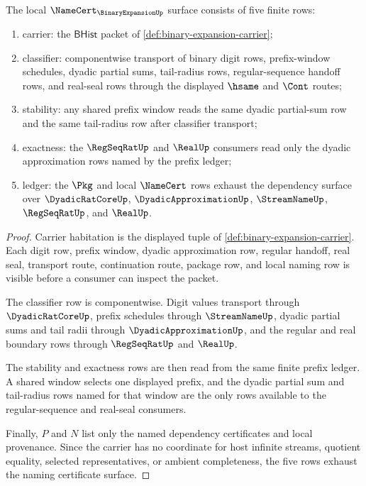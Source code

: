 \begin{theorem}
\label{thm:binary-expansion-namecert-obligations}
The local $\NameCert_{\BinaryExpansionUp}$ surface consists of five finite rows:
\begin{enumerate}
\item carrier: the $\mathsf{BHist}$ packet of \autoref{def:binary-expansion-carrier};
\item classifier: componentwise transport of binary digit rows, prefix-window schedules, dyadic partial sums, tail-radius rows, regular-sequence handoff rows, and real-seal rows through the displayed $\hsame$ and $\Cont$ routes;
\item stability: any shared prefix window reads the same dyadic partial-sum row and the same tail-radius row after classifier transport;
\item exactness: the $\RegSeqRatUp$ and $\RealUp$ consumers read only the dyadic approximation rows named by the prefix ledger;
\item ledger: the $\Pkg$ and local $\NameCert$ rows exhaust the dependency surface over $\DyadicRatCoreUp$, $\DyadicApproximationUp$, $\StreamNameUp$, $\RegSeqRatUp$, and $\RealUp$.
\end{enumerate}
\end{theorem}
\begin{proof}
Carrier habitation is the displayed tuple of \autoref{def:binary-expansion-carrier}. Each digit row, prefix window, dyadic approximation row, regular handoff, real seal, transport route, continuation route, package row, and local naming row is visible before a consumer can inspect the packet.

The classifier row is componentwise. Digit values transport through $\DyadicRatCoreUp$, prefix schedules through $\StreamNameUp$, dyadic partial sums and tail radii through $\DyadicApproximationUp$, and the regular and real boundary rows through $\RegSeqRatUp$ and $\RealUp$.

The stability and exactness rows are then read from the same finite prefix ledger. A shared window selects one displayed prefix, and the dyadic partial sum and tail-radius rows named for that window are the only rows available to the regular-sequence and real-seal consumers.

Finally, $P$ and $N$ list only the named dependency certificates and local provenance. Since the carrier has no coordinate for host infinite streams, quotient equality, selected representatives, or ambient completeness, the five rows exhaust the naming certificate surface.
\end{proof}

